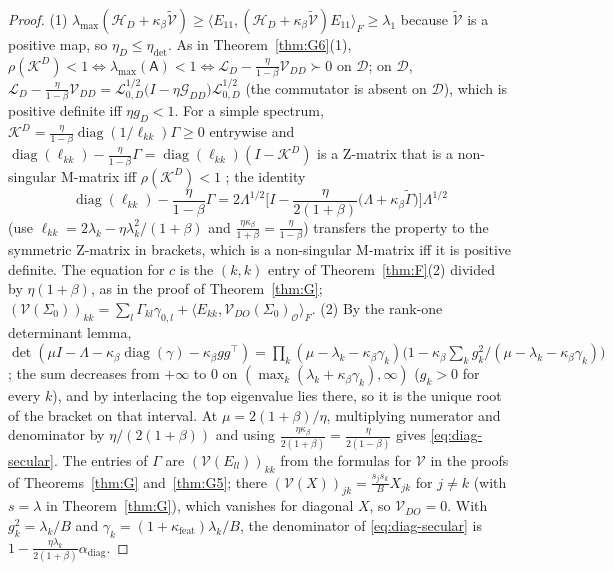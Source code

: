 \documentclass[11pt]{article}
\theoremstyle{remark}
\begin{document}
\begin{proof}
(1) $\lambda_{\max}(\mathcal H_D+\kappa_\beta\widetilde{\mathcal V})\ge\langle E_{11},(\mathcal H_D+\kappa_\beta\widetilde{\mathcal V})E_{11}\rangle_F\ge\lambda_1$ because $\widetilde{\mathcal V}$ is a positive map, so $\eta_D\le\eta_{\mathrm{det}}$. As in Theorem~\ref{thm:G6}(1), $\rho(\mathcal K^D)<1\iff\lambda_{\max}(\mathsf A)<1\iff\mathcal L_D-\frac{\eta}{1-\beta}\mathcal V_{DD}\succ0$ on $\mathcal D$; on $\mathcal D$, $\mathcal L_D-\frac{\eta}{1-\beta}\mathcal V_{DD}=\mathcal L_{0,D}^{1/2}\big(I-\eta\mathcal G_{DD}\big)\mathcal L_{0,D}^{1/2}$ (the commutator is absent on $\mathcal D$), which is positive definite iff $\eta g_D<1$. For a simple spectrum, $\mathcal K^D=\frac{\eta}{1-\beta}\operatorname{diag}(1/\ell_{kk})\Gamma\ge0$ entrywise and $\operatorname{diag}(\ell_{kk})-\frac{\eta}{1-\beta}\Gamma=\operatorname{diag}(\ell_{kk})(I-\mathcal K^D)$ is a Z-matrix that is a non-singular M-matrix iff $\rho(\mathcal K^D)<1$ \citep[Ch.~6]{berman1994}; the identity
\[
\operatorname{diag}(\ell_{kk})-\frac{\eta}{1-\beta}\Gamma=2\Lambda^{1/2}\Big[I-\frac{\eta}{2(1+\beta)}\big(\Lambda+\kappa_\beta\widetilde\Gamma\big)\Big]\Lambda^{1/2}
\]
(use $\ell_{kk}=2\lambda_k-\eta\lambda_k^2/(1+\beta)$ and $\frac{\eta\kappa_\beta}{1+\beta}=\frac{\eta}{1-\beta}$) transfers the property to the symmetric Z-matrix in brackets, which is a non-singular M-matrix iff it is positive definite. The equation for $c$ is the $(k,k)$ entry of Theorem~\ref{thm:F}(2) divided by $\eta(1+\beta)$, as in the proof of Theorem~\ref{thm:G}; $(\mathcal V(\Sigma_0))_{kk}=\sum_l\Gamma_{kl}\gamma_{0,l}+\langle E_{kk},\mathcal V_{DO}(\Sigma_0)_{\mathcal O}\rangle_F$.
(2) By the rank-one determinant lemma, $\det(\mu I-\Lambda-\kappa_\beta\operatorname{diag}(\gamma)-\kappa_\beta gg^\top)=\prod_k(\mu-\lambda_k-\kappa_\beta\gamma_k)\big(1-\kappa_\beta\sum_kg_k^2/(\mu-\lambda_k-\kappa_\beta\gamma_k)\big)$; the sum decreases from $+\infty$ to $0$ on $(\max_k(\lambda_k+\kappa_\beta\gamma_k),\infty)$ ($g_k>0$ for every $k$), and by interlacing the top eigenvalue lies there, so it is the unique root of the bracket on that interval. At $\mu=2(1+\beta)/\eta$, multiplying numerator and denominator by $\eta/(2(1+\beta))$ and using $\frac{\eta\kappa_\beta}{2(1+\beta)}=\frac{\eta}{2(1-\beta)}$ gives \eqref{eq:diag-secular}. The entries of $\Gamma$ are $(\mathcal V(E_{ll}))_{kk}$ from the formulas for $\mathcal V$ in the proofs of Theorems~\ref{thm:G} and~\ref{thm:G5}; there $(\mathcal V(X))_{jk}=\frac{s_js_k}{B}X_{jk}$ for $j\ne k$ (with $s=\lambda$ in Theorem~\ref{thm:G}), which vanishes for diagonal $X$, so $\mathcal V_{DO}=0$. With $g_k^2=\lambda_k/B$ and $\gamma_k=(1+\kappa_{\mathrm{feat}})\lambda_k/B$, the denominator of \eqref{eq:diag-secular} is $1-\frac{\eta\lambda_k}{2(1+\beta)}\alpha_{\mathrm{diag}}$.
\end{proof}
\end{document}
